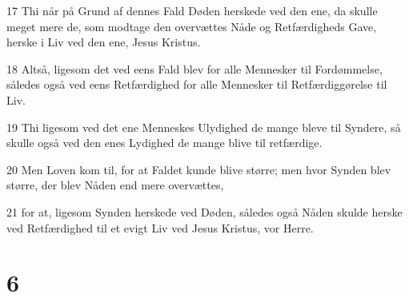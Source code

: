 \par 17 Thi når på Grund af dennes Fald Døden herskede ved den ene, da skulle meget mere de, som modtage den overvættes Nåde og Retfærdigheds Gave, herske i Liv ved den ene, Jesus Kristus.
\par 18 Altså, ligesom det ved eens Fald blev for alle Mennesker til Fordømmelse, således også ved eens Retfærdighed for alle Mennesker til Retfærdiggørelse til Liv.
\par 19 Thi ligesom ved det ene Menneskes Ulydighed de mange bleve til Syndere, så skulle også ved den enes Lydighed de mange blive til retfærdige.
\par 20 Men Loven kom til, for at Faldet kunde blive større; men hvor Synden blev større, der blev Nåden end mere overvættes,
\par 21 for at, ligesom Synden herskede ved Døden, således også Nåden skulde herske ved Retfærdighed til et evigt Liv ved Jesus Kristus, vor Herre.

\chapter{6}


